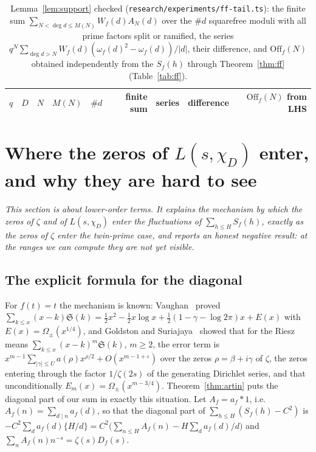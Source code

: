 \documentclass[11pt,a4paper]{article}
\theoremstyle{remark}\newtheorem{remark}[theorem]{Remark}
\newcommand{\Sig}{\mathfrak S}
\begin{document}
\begin{table}[htbp]
\centering\footnotesize\setlength{\tabcolsep}{5pt}
\caption{Lemma~\ref{lem:support} checked (\texttt{research/experiments/ff-tail.ts}): the finite sum
$\sum_{N<\deg d\le M(N)}W_f(d)A_N(d)$ over the $\#d$ squarefree moduli with all prime factors split or
ramified, the series $q^N\sum_{\deg d>N}W_f(d)(\omega_f(d)^2-\omega_f(d))/|d|$, their difference, and
$\mathrm{Off}_f(N)$ obtained independently from the $S_f(h)$ through Theorem~\ref{thm:ff}
(Table~\ref{tab:ff}).}\label{tab:fftail}
\begin{tabular}{rlrrrrrrr}
\toprule
$q$ & $D$ & $N$ & $M(N)$ & $\#d$ & finite sum & series & difference & $\mathrm{Off}_f(N)$ from LHS\\
\midrule

\end{tabular}
\end{table}

\FloatBarrier
\section{Where the zeros of $L(s,\chi_D)$ enter, and why they are hard to see}\label{sec:riesz}

\emph{This section is about lower-order terms. It explains the mechanism by which the zeros of $\zeta$
and of $L(s,\chi_D)$ enter the fluctuations of $\sum_{h\le H}S_f(h)$, exactly as the zeros of $\zeta$ enter
the twin-prime case, and reports an honest negative result: at the ranges we can compute they are not
yet visible.}

\subsection{The explicit formula for the diagonal}

For $f(t)=t$ the mechanism is known: Vaughan~\cite{Vaughan2001} proved
$\sum_{k\le x}(x-k)\Sig(k)=\tfrac12x^2-\tfrac12x\log x+\tfrac12(1-\gamma-\log2\pi)x+E(x)$ with
$E(x)=\Omega_\pm(x^{1/4})$, and Goldston and Suriajaya~\cite{GoldstonSuriajaya2021} showed that for the
Riesz means $\sum_{k\le x}(x-k)^m\Sig(k)$, $m\ge2$, the error term is
$x^{m-1}\sum_{|\gamma|\le U}a(\rho)x^{\rho/2}+O(x^{m-1+\varepsilon})$ over the zeros $\rho=\beta+i\gamma$ of
$\zeta$, the zeros entering through the factor $1/\zeta(2s)$ of the generating Dirichlet series, and that
unconditionally $E_m(x)=\Omega_\pm(x^{m-3/4})$. Theorem~\ref{thm:artin} puts the diagonal part of our
sum in exactly this situation. Let $A_f=a_f*1$, i.e.\ $A_f(n)=\sum_{d\mid n}a_f(d)$, so that the diagonal
part of $\sum_{h\le H}(S_f(h)-C^2)$ is $-C^2\sum_da_f(d)\{H/d\}=C^2\bigl(\sum_{n\le H}A_f(n)-H\sum_da_f(d)/d\bigr)$
and $\sum_nA_f(n)n^{-s}=\zeta(s)D_f(s)$.
\end{document}
